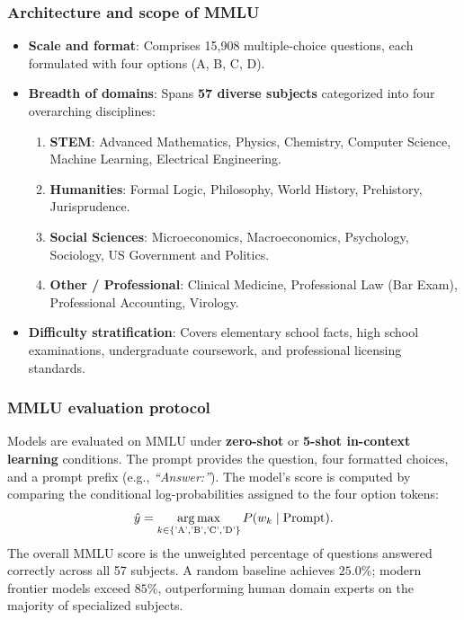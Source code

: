 \documentclass[../../../main.tex]{subfiles}
\begin{document}
\subsubsection{Architecture and scope of MMLU}
\begin{itemize}
    \item \textbf{Scale and format}: Comprises 15,908 multiple-choice questions, each formulated with four options (A, B, C, D).
    \item \textbf{Breadth of domains}: Spans \textbf{57 diverse subjects} categorized into four overarching disciplines:
    \begin{enumerate}
        \item \textbf{STEM}: Advanced Mathematics, Physics, Chemistry, Computer Science, Machine Learning, Electrical Engineering.
        \item \textbf{Humanities}: Formal Logic, Philosophy, World History, Prehistory, Jurisprudence.
        \item \textbf{Social Sciences}: Microeconomics, Macroeconomics, Psychology, Sociology, US Government and Politics.
        \item \textbf{Other / Professional}: Clinical Medicine, Professional Law (Bar Exam), Professional Accounting, Virology.
    \end{enumerate}
    \item \textbf{Difficulty stratification}: Covers elementary school facts, high school examinations, undergraduate coursework, and professional licensing standards.
\end{itemize}

\subsubsection{MMLU evaluation protocol}
Models are evaluated on MMLU under \textbf{zero-shot} or \textbf{5-shot in-context learning} conditions. The prompt provides the question, four formatted choices, and a prompt prefix (e.g., \textit{``Answer:''}). The model's score is computed by comparing the conditional log-probabilities assigned to the four option tokens:
\begin{equation}
\label{eq:mmlu_scoring}
\hat{y} = \operatorname*{\mathrm{arg\,max}}_{k \in \{\text{'A'}, \text{'B'}, \text{'C'}, \text{'D'}\}} P(w_k \mid \text{Prompt}).
\end{equation}
The overall MMLU score is the unweighted percentage of questions answered correctly across all 57 subjects. A random baseline achieves $25.0\%$; modern frontier models exceed $85\%$, outperforming human domain experts on the majority of specialized subjects.
\end{document}
